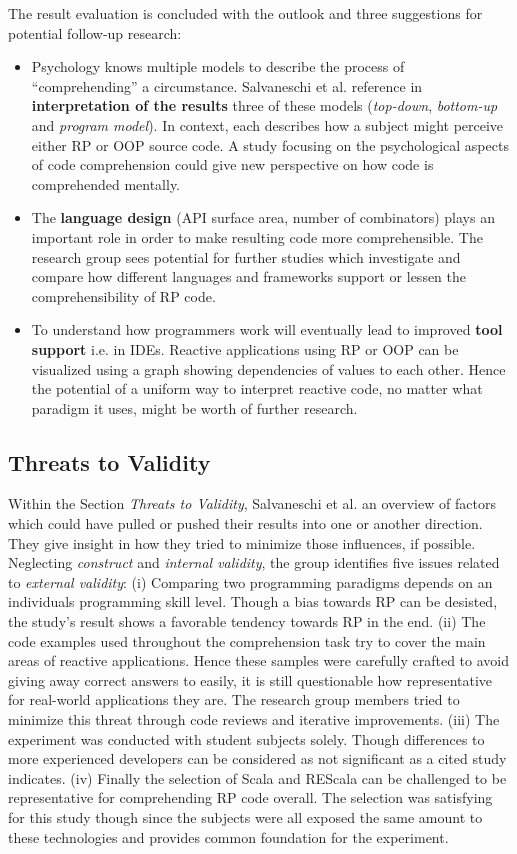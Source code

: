 \documentclass[12pt,a4paper]{article}
\begin{document}
The result evaluation is concluded with the outlook and three suggestions for potential follow-up research:

\begin{itemize}
	\item Psychology knows multiple models to describe the process of ``comprehending'' a circumstance. Salvaneschi et al. reference in \textbf{interpretation of the results} three of these models (\emph{top-down}, \emph{bottom-up} and \emph{program model}). In context, each describes how a subject might perceive either RP or OOP source code. A study focusing on the psychological aspects of code comprehension could give new perspective on how code is comprehended mentally.
	\item The \textbf{language design} (API surface area, number of combinators) plays an important role in order to make resulting code more comprehensible. The research group sees potential for further studies which investigate and compare how different languages and frameworks support or lessen the comprehensibility of RP code.
	\item To understand how programmers work will eventually lead to improved \textbf{tool support} i.e. in IDEs. Reactive applications using RP or OOP can be visualized using a graph showing dependencies of values to each other. Hence the potential of a uniform way to interpret reactive code, no matter what paradigm it uses, might be worth of further research.
\end{itemize}

\subsection{Threats to Validity}

Within the Section \emph{Threats to Validity}, Salvaneschi et al. an overview of factors which could have pulled or pushed their results into one or another direction. They give insight in how they tried to minimize those influences, if possible. Neglecting \emph{construct} and \emph{internal validity}, the group identifies five issues related to \emph{external validity}: (i) Comparing two programming paradigms depends on an individuals programming skill level. Though a bias towards RP can be desisted, the study's result shows a favorable tendency towards RP in the end. (ii) The code examples used throughout the comprehension task try to cover the main areas of reactive applications. Hence these samples were carefully crafted to avoid giving away correct answers to easily, it is still questionable how representative for real-world applications they are. The research group members tried to minimize this threat through code reviews and iterative improvements. (iii) The experiment was conducted with student subjects solely. Though differences to more experienced developers can be considered as not significant as a cited study \cite{DiPenta} indicates. (iv) Finally the selection of Scala and REScala can be challenged to be representative for comprehending RP code overall. The selection was satisfying for this study though since the subjects were all exposed the same amount to these technologies and provides common foundation for the experiment.
\end{document}
